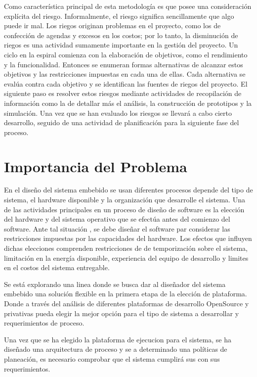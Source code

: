 Como característica principal de esta metodología es que posee una consideración explícita del riesgo. Informalmente, el riesgo significa sencillamente que algo puede ir mal. Los riegos originan problemas en el proyecto, como los de confección de agendas y excesos en los costos; por lo tanto, la disminución de riegos es una actividad sumamente importante en la gestión del proyecto.
Un ciclo en la espiral comienza con la elaboración de objetivos, como el rendimiento y la funcionalidad. Entonces se enumeran formas alternativas de alcanzar estos objetivos y las restricciones impuestas en cada una de ellas. Cada alternativa se evalúa contra cada objetivo y se identifican las fuentes de riegos del proyecto. El siguiente paso es resolver estos riesgos mediante actividades de recopilación de información como la de detallar más el análisis, la construcción de prototipos y la simulación. Una vez que se han evaluado los riesgos se llevará a cabo cierto desarrollo, seguido de una actividad de planificación para la siguiente fase del proceso.


\section{Importancia del Problema}

En el diseño del sistema embebido se usan diferentes procesos depende del tipo de sistema, el hardware disponible y la organización que desarrolle el sistema. Una de las actividades principales en un proceso de diseño de software es la elección del hardware y del sistema operativo que se efectúa antes del comienzo del software. Ante tal situación , se debe diseñar el software par considerar las restricciones impuestas por las capacidades del hardware.
Los efectos que influyen dichas elecciones comprenden restricciones de de temporización sobre el sistema, limitación en la energía disponible, experiencia del equipo de desarrollo y limites en el costos del sistema entregable.
 
Se está explorando una linea donde se busca dar al diseñador del sistema embebido una solución flexible en la primera etapa de la elección de plataforma. Donde a través del análisis de diferentes plataformas de desarrollo OpenSource y privativas pueda elegir la mejor opción para el tipo de sistema a desarrollar y requerimientos de proceso. 
 
Una vez que se ha elegido la plataforma de ejecucion para el sistema, se ha diseñado una arquitectura de proceso y se a determinado una políticas de planeación, es necesario comprobar que el sistema cumplirá sus con sus requerimientos.


